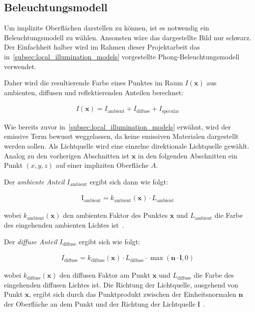 \subsection{Beleuchtungsmodell}
\label{sec:rendering_implicit_surfaces_lighting}

Um implizite Oberflächen darstellen zu können, ist es notwendig ein
Beleuchtungsmodell zu wählen. Ansonsten wäre das dargestellte Bild nur
schwarz.  Der Einfachheit halber wird im Rahmen dieser Projektarbeit das
in~\autoref{subsec:local_illumination_models} vorgestellte
Phong-Beleuchtungsmodell verwendet.

Daher wird die resultierende Farbe eines Punktes im Raum $I(\bm{x})$ aus
ambienten, diffusen und reflektierenden Anteilen berechnet:

\begin{gather}
    I(\bm{x}) = I_{\text{ambient}} + I_{\text{diffuse}} + I_{\text{specular}}
\end{gather}

Wie bereits zuvor in~\autoref{subsec:local_illumination_models} erwähnt,
wird der emissive Term bewusst weggelassen, da keine emissiven Materialen
dargestellt werden sollen. Als Lichtquelle wird eine einzelne direktionale
Lichtquelle gewählt. Analog zu den vorherigen Abschnitten ist $\bm{x}$
in den folgenden Abschnitten ein Punkt $(x, y, z)$ auf einer impliziten
Oberfläche $A$.

Der \textit{ambiente Anteil} $I_{\text{ambient}}$ ergibt sich dann wie
folgt:

\begin{gather}
    \text{I}_{\text{ambient}} = k_{\text{ambient}}(\bm{x}) \cdot L_{\text{ambient}}
\end{gather}

wobei $k_{\text{ambient}}(\bm{x})$ den ambienten Faktor des
Punktes $\bm{x}$ und $L_{\text{ambient}}$ die Farbe des eingehenden ambienten
Lichtes ist~\parencites[S. 723]{glassner_introduction_1989}[Kapitel 5, Abschnitt 5.2.1]{fernando_cg_2003}.

Der \textit{diffuse Anteil} $I_{\text{diffuse}}$ ergibt sich wie folgt:

\begin{gather}
    I_{\text{diffuse}} = k_{\text{diffuse}}(\bm{x}) \cdot L_{\text{diffuse}} \cdot \max(\bm{n} \cdot \bm{l}, 0)
\end{gather}

wobei $k_{\text{diffuse}}(\bm{x})$ den diffusen Faktor am Punkt $\bm{x}$
und $L_{\text{diffuse}}$ die Farbe des eingehenden diffusen Lichtes ist.
Die Richtung der Lichtquelle, ausgehend von Punkt $\bm{x}$, ergibt sich
durch das Punktprodukt zwischen der Einheitsnormalen $\bm{n}$ der
Oberfläche an dem Punkt und der Richtung der Lichtquelle
$\bm{l}$~\parencites[S. 724]{glassner_introduction_1989}[Kapitel 5, Abschnitt 5.2.1]{fernando_cg_2003}.

